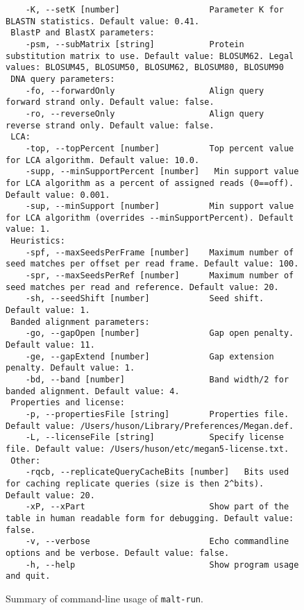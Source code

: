 \documentclass[11pt]{article}
\begin{document}
\begin{figure}[h]
{\begin{verbatim}
	-K, --setK [number]                  Parameter K for BLASTN statistics. Default value: 0.41.
 BlastP and BlastX parameters:
	-psm, --subMatrix [string]           Protein substitution matrix to use. Default value: BLOSUM62. Legal values: BLOSUM45, BLOSUM50, BLOSUM62, BLOSUM80, BLOSUM90
 DNA query parameters:
	-fo, --forwardOnly                   Align query forward strand only. Default value: false.
	-ro, --reverseOnly                   Align query reverse strand only. Default value: false.
 LCA:
	-top, --topPercent [number]          Top percent value for LCA algorithm. Default value: 10.0.
	-supp, --minSupportPercent [number]   Min support value for LCA algorithm as a percent of assigned reads (0==off). Default value: 0.001.
	-sup, --minSupport [number]          Min support value for LCA algorithm (overrides --minSupportPercent). Default value: 1.
 Heuristics:
	-spf, --maxSeedsPerFrame [number]    Maximum number of seed matches per offset per read frame. Default value: 100.
	-spr, --maxSeedsPerRef [number]      Maximum number of seed matches per read and reference. Default value: 20.
	-sh, --seedShift [number]            Seed shift. Default value: 1.
 Banded alignment parameters:
	-go, --gapOpen [number]              Gap open penalty. Default value: 11.
	-ge, --gapExtend [number]            Gap extension penalty. Default value: 1.
	-bd, --band [number]                 Band width/2 for banded alignment. Default value: 4.
 Properties and license:
	-p, --propertiesFile [string]        Properties file. Default value: /Users/huson/Library/Preferences/Megan.def.
	-L, --licenseFile [string]           Specify license file. Default value: /Users/huson/etc/megan5-license.txt.
 Other:
	-rqcb, --replicateQueryCacheBits [number]   Bits used for caching replicate queries (size is then 2^bits). Default value: 20.
	-xP, --xPart                         Show part of the table in human readable form for debugging. Default value: false.
	-v, --verbose                        Echo commandline options and be verbose. Default value: false.
	-h, --help                           Show program usage and quit.
\end{verbatim}
}
\caption{Summary of command-line usage of {\tt malt-run}.}\label{fig:malt-run-usage}
\end{figure}


\FloatBarrier

{\small


}

\printindex
\end{document}
